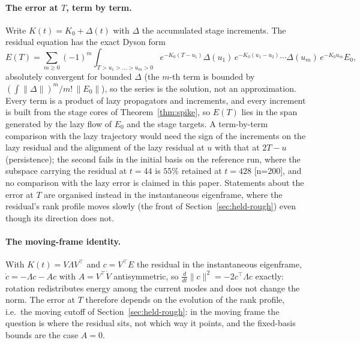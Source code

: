 \paragraph{The error at $T$, term by term.} Write $K(t)=K_0+\Delta(t)$ with
$\Delta$ the accumulated stage increments. The residual equation has the exact
Dyson form
\[
E(T)=\sum_{m\ge0}(-1)^m\!\!\int_{T>u_1>\dots>u_m>0}\!\! e^{-K_0(T-u_1)}\Delta(u_1)\,e^{-K_0(u_1-u_2)}\cdots\Delta(u_m)\,e^{-K_0u_m}E_0,
\]
absolutely convergent for bounded $\Delta$ (the $m$-th term is bounded by
$(\int\|\Delta\|)^m/m!\,\|E_0\|$), so the series is the solution, not an
approximation. Every term is a product of lazy propagators and increments, and
every increment is built from the stage cores of Theorem~\ref{thm:spike}, so
$E(T)$ lies in the span generated by the lazy flow of $E_0$ and the stage
targets. A term-by-term comparison with the lazy trajectory would need the
sign of the increments on the lazy residual and the alignment of the lazy
residual at $u$ with that at $2T-u$ (persistence); the second fails in the
initial basis on the reference run, where the subspace carrying the residual
at $t=44$ is $55\%$ retained at $t=428$ [n=200], and no comparison with the
lazy error is claimed in this paper. Statements about the error at $T$ are
organised instead in the instantaneous eigenframe, where the residual's rank
profile moves slowly (the front of Section~\ref{sec:held-rough}) even though
its direction does not.

\paragraph{The moving-frame identity.} With $K(t)=V\Lambda V^{\!\top}$ and
$c=V^{\!\top}E$ the residual in the instantaneous eigenframe,
$\dot c=-\Lambda c-Ac$ with $A=V^{\!\top}\dot V$ antisymmetric, so
$\frac d{dt}\|c\|^2=-2c^{\!\top}\Lambda c$ exactly: rotation redistributes energy
among the current modes and does not change the norm. The error at $T$
therefore depends on the evolution of the rank profile, i.e.\ the moving
cutoff of Section~\ref{sec:held-rough}: in the moving frame the question is
where the residual sits, not which way it points, and the fixed-basis bounds
are the case $A=0$.

